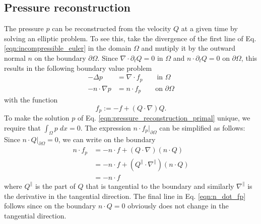 \documentclass[11pt]{article}
\begin{document}
\subsection{Pressure reconstruction}
The pressure $p$ can be reconstructed from the velocity $Q$ at a given time by solving an elliptic problem. To see this, take the divergence of the first line of Eq. \eqref{eqn:incompressible_euler} in the domain $\Omega$ and mutiply it by the outward normal $n$ on the boundary $\partial \Omega$. Since $\nabla\cdot \partial_t Q = 0$ in $\Omega$ and $n\cdot \partial_t Q=0$ on $\partial \Omega$, this results in the following boundary value problem
\begin{equation}
    \begin{aligned}
        -\Delta p        & = \nabla \cdot f_p\qquad\text{in $\Omega$}    \\
        -n\cdot \nabla p & = n\cdot f_p \qquad\text{on $\partial\Omega$}
    \end{aligned}\label{eqn:pressure_reconstruction_primal}
\end{equation}
with the function
\begin{equation}
    f_p := -f + (Q\cdot \nabla) Q.
\end{equation}
To make the solution $p$ of Eq. \eqref{eqn:pressure_reconstruction_primal} unique, we require that $\int_\Omega p\;dx=0$. The expression $n\cdot f_p\vert_{\partial \Omega}$ can be simplified as follows: Since $n\cdot Q\vert_{\partial \Omega}=0$, we can write on the boundary
\begin{equation}
    \begin{aligned}
        n\cdot f_p & = -n\cdot f + (Q\cdot \nabla) (n\cdot Q)                   \\
                   & = -n\cdot f+(Q^\parallel \cdot \nabla^\parallel)(n\cdot Q) \\
                   & = -n\cdot f
    \end{aligned}\label{eqn:n_dot_fp}
\end{equation}
where $Q^\parallel$ is the part of $Q$ that is tangential to the boundary and similarly $\nabla^\parallel$ is the derivative in the tangential direction. The final line in Eq. \eqref{eqn:n_dot_fp} follows since on the boundary $n\cdot Q=0$ obviously does not change in the tangential direction.
\end{document}
